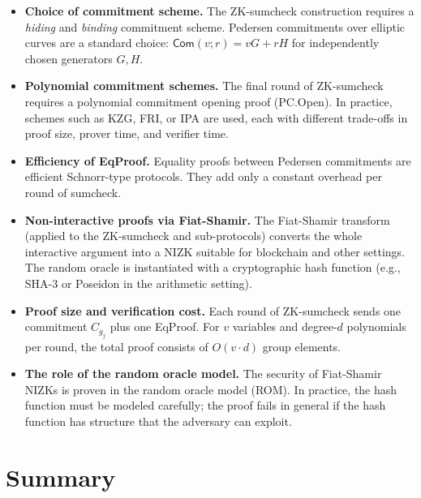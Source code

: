 \documentclass[11pt]{article}
\begin{document}
\begin{highlight}[title={Practical Considerations}]
\begin{itemize}
  \item \textbf{Choice of commitment scheme.}
    The ZK-sumcheck construction requires a \emph{hiding} and
    \emph{binding} commitment scheme.  Pedersen commitments over
    elliptic curves are a standard choice: $\mathsf{Com}(v; r) = vG + rH$
    for independently chosen generators $G, H$.

  \item \textbf{Polynomial commitment schemes.}
    The final round of ZK-sumcheck requires a polynomial commitment
    opening proof (PC.Open).  In practice, schemes such as KZG,
    FRI, or IPA are used, each with different trade-offs in proof size,
    prover time, and verifier time.

  \item \textbf{Efficiency of EqProof.}
    Equality proofs between Pedersen commitments are efficient
    Schnorr-type protocols.  They add only a constant overhead per
    round of sumcheck.

  \item \textbf{Non-interactive proofs via Fiat-Shamir.}
    The Fiat-Shamir transform (applied to the ZK-sumcheck and
    sub-protocols) converts the whole interactive argument into a
    NIZK suitable for blockchain and other settings.  The random
    oracle is instantiated with a cryptographic hash function (e.g.,
    SHA-3 or Poseidon in the arithmetic setting).

  \item \textbf{Proof size and verification cost.}
    Each round of ZK-sumcheck sends one commitment $C_{g_j}$ plus
    one EqProof.  For $v$ variables and degree-$d$ polynomials per
    round, the total proof consists of $O(v \cdot d)$ group elements.

  \item \textbf{The role of the random oracle model.}
    The security of Fiat-Shamir NIZKs is proven in the random oracle
    model (ROM).  In practice, the hash function must be modeled
    carefully; the proof fails in general if the hash function has
    structure that the adversary can exploit.
\end{itemize}
\end{highlight}

\section*{Summary}
\end{document}
